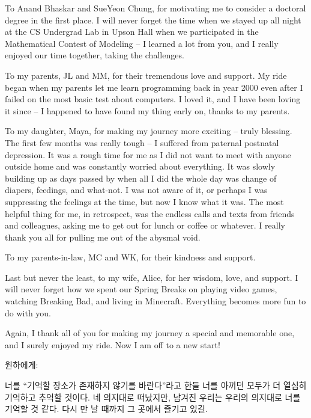 To Anand Bhaskar and SueYeon Chung, for motivating me to consider a doctoral degree in the first place. I will never forget the time when we stayed up all night at the CS Undergrad Lab in Upson Hall when we participated in the Mathematical Contest of Modeling -- I learned a lot from you, and I really enjoyed our time together, taking the challenges.

To my parents, JL and MM, for their tremendous love and support. My ride began when my parents let me learn programming back in year 2000 even after I failed on the most basic test about computers. I loved it, and I have been loving it since -- I happened to have found my thing early on, thanks to my parents. 

To my daughter, Maya, for making my journey more exciting -- truly blessing. The first few months was really tough -- I suffered from paternal postnatal depression. It was a rough time for me as I did not want to meet with anyone outside home and was constantly worried about everything. It was slowly building up as days passed by when all I did the whole day was change of diapers, feedings, and what-not. I was not aware of it, or perhaps I was suppressing the feelings at the time, but now I know what it was. The most helpful thing for me, in retrospect, was the endless calls and texts from friends and colleagues, asking me to get out for lunch or coffee or whatever. I really thank you all for pulling me out of the abysmal void.

To my parents-in-law, MC and WK, for their kindness and support.

Last but never the least, to my wife, Alice, for her wisdom, love, and support. I will never forget how we spent our Spring Breaks on playing video games, watching Breaking Bad, and living in Minecraft. Everything becomes more fun to do with you.

Again, I thank all of you for making my journey a special and memorable one, and I surely enjoyed my ride. Now I am off to a new start!


\vspace{4 em}

원하에게: 

너를 ``기억할 장소가 존재하지 않기를 바란다''라고 한들 너를 아끼던 모두가 더 열심히 기억하고 추억할 것이다. 네 의지대로 떠났지만, 남겨진 우리는 우리의 의지대로 너를 기억할 것 같다. 다시 만 날 때까지 그 곳에서 즐기고 있길.
